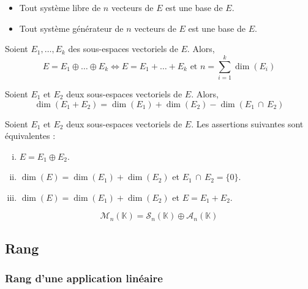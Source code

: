 	\begin{proposition}
		\begin{itemize}
			\item Tout système libre de $n$ vecteurs de $E$ est une base de $E$.
			\item Tout système générateur de $n$ vecteurs de $E$ est une base de $E$.
		\end{itemize}
	\end{proposition}

	\begin{proposition}
		Soient $E_1, \dots, E_k$ des sous-espaces vectoriels de $E$. Alors,
		\[ E = E_1 \oplus \dots \oplus E_k \iff E = E_1 + \dots + E_k \text{ et } n = \sum_{i=1}^{k} \dim(E_i) \]
	\end{proposition}

	\begin{proposition}
		Soient $E_1$ et $E_2$ deux sous-espaces vectoriels de $E$. Alors,
		\[ \dim(E_1 + E_2) = \dim(E_1) + \dim(E_2) - \dim(E_1 \, \cap \, E_2) \]
	\end{proposition}

	\begin{corollary}
		Soient $E_1$ et $E_2$ deux sous-espaces vectoriels de $E$. Les assertions suivantes sont équivalentes :
		\begin{enumerate}[(i)]
			\item $E = E_1 \oplus E_2$.
			\item $\dim(E) = \dim(E_1) + \dim(E_2)$ et $E_1 \, \cap \, E_2 = \{ 0 \}$.
			\item $\dim(E) = \dim(E_1) + \dim(E_2)$ et $E = E_1 + E_2$.
		\end{enumerate}
	\end{corollary}


	\begin{example}
		\[ \mathcal{M}_n(\mathbb{K}) = \mathcal{S}_n(\mathbb{K}) \oplus \mathcal{A}_n(\mathbb{K}) \]
	\end{example}

	\subsection{Rang}

	\subsubsection{Rang d'une application linéaire}

